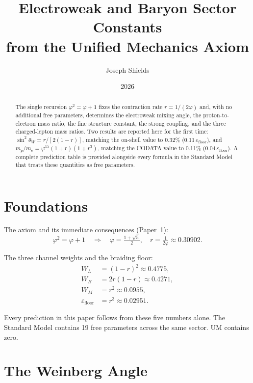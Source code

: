 \documentclass[12pt]{article}
\title{\textbf{Electroweak and Baryon Sector Constants\\
from the Unified Mechanics Axiom}}
\author{Joseph Shields}
\date{2026}
\begin{document}
\maketitle

\begin{abstract}
The single recursion $\varphi^2 = \varphi + 1$ fixes the contraction rate
$r = 1/(2\varphi)$ and, with no additional free parameters,
determines the electroweak mixing angle, the proton-to-electron
mass ratio, the fine structure constant, the strong coupling, and
the three charged-lepton mass ratios. Two results are reported here
for the first time: $\sin^2\!\theta_W = r/[2(1-r)]$, matching the
on-shell value to 0.32\% (0.11\,$\varepsilon_{\text{floor}}$), and
$m_p/m_e = \varphi^{15}(1+r)(1+r^3)$, matching the CODATA value to
0.11\% (0.04\,$\varepsilon_{\text{floor}}$). A complete prediction
table is provided alongside every formula in the Standard Model that
treats these quantities as free parameters.
\end{abstract}

\section{Foundations}

The axiom and its immediate consequences (Paper~1):
\begin{equation}
  \varphi^2 = \varphi + 1 \quad\Rightarrow\quad
  \varphi = \tfrac{1+\sqrt{5}}{2},\quad
  r = \tfrac{1}{2\varphi} \approx 0.30902.
  \label{eq:axiom}
\end{equation}

The three channel weights and the braiding floor:
\begin{align}
  W_L &= (1-r)^2 \approx 0.4775, \label{eq:wl}\\
  W_B &= 2r(1-r) \approx 0.4271, \label{eq:wb}\\
  W_M &= r^2     \approx 0.0955, \label{eq:wm}\\
  \varepsilon_{\text{floor}} &= r^3 \approx 0.02951. \label{eq:eps}
\end{align}

Every prediction in this paper follows from these five numbers alone.
The Standard Model contains 19 free parameters across the same
sector. UM contains zero.

\section{The Weinberg Angle}
\end{document}

